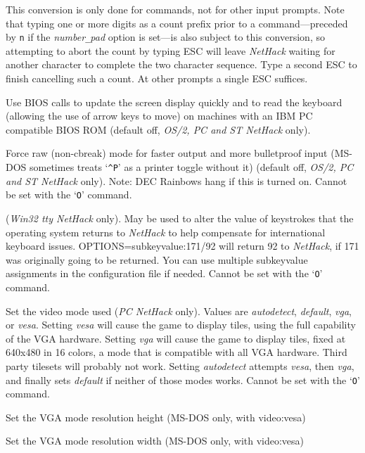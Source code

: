 This conversion is only done for commands, not for other input prompts.
Note that typing one or more digits as a count prefix prior to a
command---preceded by {\tt n} if the {\it number\verb+_+pad\/}
option is set---is
also subject to this conversion, so attempting to
abort the count by typing ESC will leave {\it NetHack\/} waiting for another
character to complete the two character sequence.
Type a second ESC to finish cancelling such a count.
At other prompts a single ESC suffices.
\item[\ib{BIOS}]
Use BIOS calls to update the screen display quickly and to read the keyboard
(allowing the use of arrow keys to move) on machines with an IBM PC
compatible BIOS ROM (default off, {\it OS/2, PC\/ {\rm and} ST NetHack\/} only).
\item[\ib{rawio}]
Force raw (non-cbreak) mode for faster output and more
bulletproof input (MS-DOS sometimes treats `{\tt \^{}P}' as a printer toggle
without it) (default off, {\it OS/2, PC\/ {\rm and} ST NetHack\/} only).
Note:  DEC Rainbows hang if this is turned on.
Cannot be set with the `{\tt O}' command.
\item[\ib{subkeyvalue}]
({\it Win32 tty NetHack \/} only).
May be used to alter the value of keystrokes that the operating system
returns to {\it NetHack\/} to help compensate for international keyboard
issues.
OPTIONS=subkeyvalue:171/92
will return 92 to {\it NetHack\/}, if 171 was originally going to be returned.
You can use multiple subkeyvalue assignments in the configuration file
if needed.
Cannot be set with the `{\tt O}' command.
\item[\ib{video}]
Set the video mode used ({\it PC\/ NetHack\/} only).
Values are {\it autodetect\/}, {\it default\/}, {\it vga\/}, or {\it vesa\/}.
Setting {\it vesa\/} will cause the game to display tiles, using the full
capability of the VGA hardware.
Setting {\it vga\/} will cause the game to display tiles, fixed at 640x480
in 16 colors, a mode that is compatible with all VGA hardware. Third party
tilesets will probably not work.
Setting {\it autodetect\/} attempts {\it vesa\/}, then {\it vga\/}, and
finally sets {\it default\/} if neither of those modes works.
Cannot be set with the `{\tt O}' command.
\item[\ib{video\verb+_+height}]
Set the VGA mode resolution height (MS-DOS only, with video:vesa)
\item[\ib{video\verb+_+width}]
Set the VGA mode resolution width (MS-DOS only, with video:vesa)
\item[\ib{videocolors}]
